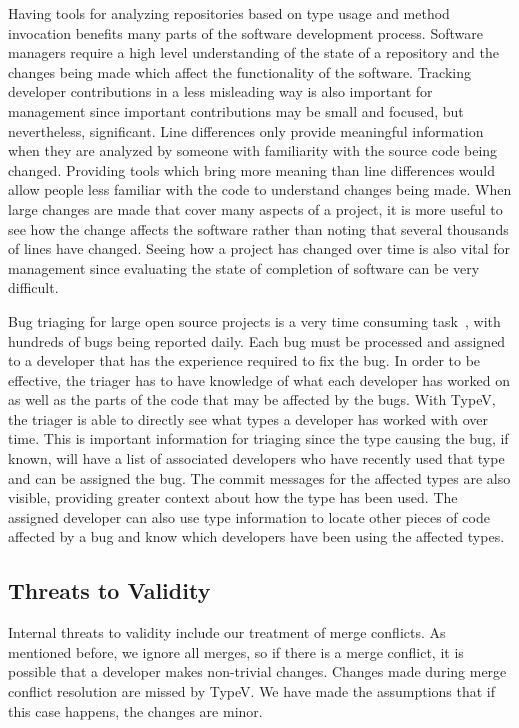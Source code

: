 Having tools for analyzing repositories based on type usage and method invocation benefits many parts of the software development process. Software managers require a high level understanding of the state of a repository and the changes being made which affect the functionality of the software. Tracking developer contributions in a less misleading way is also important for management since important contributions may be small and focused, but nevertheless, significant. Line differences only provide meaningful information when they are analyzed by someone with familiarity with the source code being changed. Providing tools which bring more meaning than line differences would allow people less familiar with the code to understand changes being made. When large changes are made that cover many aspects of a project, it is more useful to see how the change affects the software rather than noting that several thousands of lines have changed. Seeing how a project has changed over time is also vital for management since evaluating the state of completion of software can be very difficult.

Bug triaging for large open source projects is a very time consuming task~\cite{badashian2015}, with hundreds  of bugs being reported daily. Each bug must be processed and assigned to a developer that has the experience required to fix the bug. In order to be effective, the triager has to have knowledge of what each developer has worked on as well as the parts of the code that may be affected by the bugs. With TypeV, the triager is able to directly see what types a developer has worked with over time. This is important information for triaging since the type causing the bug, if known, will have a list of associated developers who have recently used that type and can be assigned the bug. The commit messages for the affected types are also visible, providing greater context about how the type has been used. The assigned developer can also use type information to locate other pieces of code affected by a bug and know which developers have been using the affected types.

\subsection{Threats to Validity}

Internal threats to validity include our treatment of merge conflicts. As mentioned before, we ignore all merges, so if there is a merge conflict, it is possible that a developer makes non-trivial changes. Changes made during merge conflict resolution are missed by TypeV. We have made the assumptions that if this case happens, the changes are minor.

